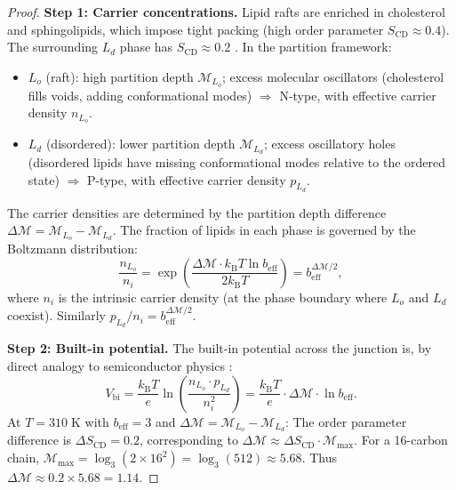 \documentclass[twocolumn,10pt]{article}
\theoremstyle{remark}
\newcommand{\kB}{k_{\mathrm{B}}}
\newcommand{\Depth}{\mathcal{M}}
\newcommand{\beff}{b_{\mathrm{eff}}}
\begin{document}
\begin{proof}
\textbf{Step 1: Carrier concentrations.}
Lipid rafts \cite{simons1997} are enriched in cholesterol and sphingolipids, which impose tight packing (high order parameter $S_{\mathrm{CD}} \approx 0.4$). The surrounding $L_d$ phase has $S_{\mathrm{CD}} \approx 0.2$ \cite{gennis1989}. In the partition framework:
\begin{itemize}
\item $L_o$ (raft): high partition depth $\Depth_{L_o}$; excess molecular oscillators (cholesterol fills voids, adding conformational modes) $\Rightarrow$ N-type, with effective carrier density $n_{L_o}$.
\item $L_d$ (disordered): lower partition depth $\Depth_{L_d}$; excess oscillatory holes (disordered lipids have missing conformational modes relative to the ordered state) $\Rightarrow$ P-type, with effective carrier density $p_{L_d}$.
\end{itemize}

The carrier densities are determined by the partition depth difference $\Delta\Depth = \Depth_{L_o} - \Depth_{L_d}$. The fraction of lipids in each phase is governed by the Boltzmann distribution:
\begin{equation}
\frac{n_{L_o}}{n_i} = \exp\!\left(\frac{\Delta\Depth \cdot \kB T \ln \beff}{2\kB T}\right) = \beff^{\Delta\Depth/2},
\end{equation}
where $n_i$ is the intrinsic carrier density (at the phase boundary where $L_o$ and $L_d$ coexist). Similarly $p_{L_d}/n_i = \beff^{\Delta\Depth/2}$.

\textbf{Step 2: Built-in potential.}
The built-in potential across the junction is, by direct analogy to semiconductor physics \cite{shockley1949}:
\begin{equation}
V_{\mathrm{bi}} = \frac{\kB T}{e} \ln\!\left(\frac{n_{L_o} \cdot p_{L_d}}{n_i^2}\right) = \frac{\kB T}{e} \cdot \Delta\Depth \cdot \ln \beff.
\end{equation}
At $T = 310\;\mathrm{K}$ with $\beff = 3$ and $\Delta\Depth = \Depth_{L_o} - \Depth_{L_d}$: The order parameter difference is $\Delta S_{\mathrm{CD}} = 0.2$, corresponding to $\Delta\Depth \approx \Delta S_{\mathrm{CD}} \cdot \Depth_{\max}$. For a 16-carbon chain, $\Depth_{\max} = \log_3(2 \times 16^2) = \log_3(512) \approx 5.68$. Thus $\Delta\Depth \approx 0.2 \times 5.68 = 1.14$.


\end{proof}
\end{document}
